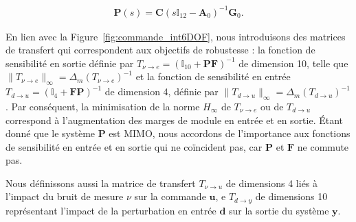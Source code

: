 \begin{align*}
    \boldsymbol{P}(s) = \boldsymbol{C} (s \mathbb{I}_{12} - \boldsymbol{A}_{0})^{-1} \boldsymbol{G}_{0}.
\end{align*} 

En lien avec la Figure~\ref{fig:commande_int6DOF}, nous introduisons des matrices de transfert qui correspondent aux objectifs de robustesse : la fonction de sensibilité en sortie définie par $T_{\nu \rightarrow e}=(\mathbb{I}_{10}+\boldsymbol{P}\boldsymbol{F})^{-1}$ de dimension 10, telle que $\lVert T_{\nu \rightarrow e} \rVert _{\infty}=\Delta_m(T_{\nu \rightarrow e})^{-1} $ et la fonction de sensibilité en entrée $T_{d \rightarrow u}=(\mathbb{I}_{4}+\boldsymbol{F}\boldsymbol{P})^{-1}$ de dimension 4, définie par $\lVert T_{d \rightarrow u} \rVert _{\infty}=\Delta_m(T_{d \rightarrow u})^{-1}$.
Par conséquent, la minimisation de la norme $H_{\infty}$ de $T_{\nu \rightarrow e}$ ou de $T_{d \rightarrow u}$ correspond à l'augmentation des marges de module en entrée et en sortie. Étant donné que le système $\boldsymbol{P}$ est MIMO, nous accordons de l'importance aux fonctions de sensibilité en entrée et en sortie qui ne coïncident pas, car $\boldsymbol{P}$ et $\boldsymbol{F}$ ne commute pas.

Nous définissons aussi la matrice de transfert $T_{\nu \rightarrow u}$ de dimensions 4 liés à l'impact du bruit de mesure $\nu$ sur la commande $\boldsymbol{u}$, e $T_{d \rightarrow y}$ de dimensions 10 représentant l'impact de la perturbation en entrée $\boldsymbol{d}$ sur la sortie du système $\boldsymbol{y}$. 

